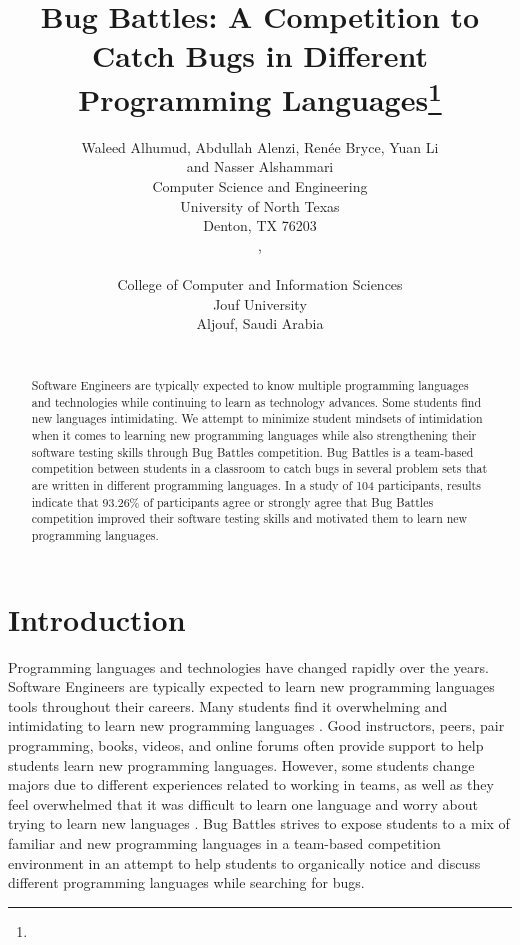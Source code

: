 \documentclass{article}
\title{Bug Battles: A Competition to Catch Bugs in Different Programming Languages\footnote{\protect}
}
\author{
Waleed Alhumud\affmark[1], Abdullah Alenzi\affmark[1], Ren\'ee Bryce\affmark[1], Yuan Li\affmark[1] \\and Nasser Alshammari \affmark[2]\\
\affmark[1]Computer Science and Engineering\\
University of North Texas\\
Denton, TX 76203\\
\email{\{WaleedAlhumud,AbdullahAlenzi\}@my.unt.edu},\\
\email{\{Renee.Bryce,Yuan.Li2\}@unt.edu}\\
\affmark[2]College of Computer and Information Sciences\\
Jouf University\\
Aljouf, Saudi Arabia\\
\email{Nashamri@ju.edu.sa}\\
}
\begin{document}
\maketitle
\begin{abstract}
Software Engineers are typically expected to know multiple programming languages and technologies while continuing to learn as technology advances. Some students find new languages intimidating. We attempt to minimize student mindsets of intimidation when it comes to learning new programming languages while also strengthening their software testing skills through Bug Battles competition. Bug Battles is a team-based competition between students in a classroom to catch bugs in several problem sets that are written in different programming languages. In a study of 104 participants, results indicate that 93.26\% of participants agree or strongly agree that Bug Battles competition improved their software testing skills and motivated them to learn new programming languages.  
\end{abstract}

\section{Introduction}
Programming languages and technologies have changed rapidly over the years. Software Engineers are typically expected to learn new programming languages tools throughout their careers. Many students find it overwhelming and intimidating to learn new programming languages \cite{denny2022novice}. Good instructors, peers, pair programming, books, videos, and online forums often provide support to help students learn new programming languages. However, some students change majors due to different experiences related to working in teams, as well as they feel overwhelmed that it was difficult to learn one language and worry about trying to learn new languages
 \cite{denny2022novice}\cite{10.1145/3141880.3141881}\cite{kapoor2018considerations}.
Bug Battles strives to expose students to a mix of familiar and new programming languages in a team-based competition environment in an attempt to help students to organically notice and discuss different programming languages while searching for bugs.
\end{document}
